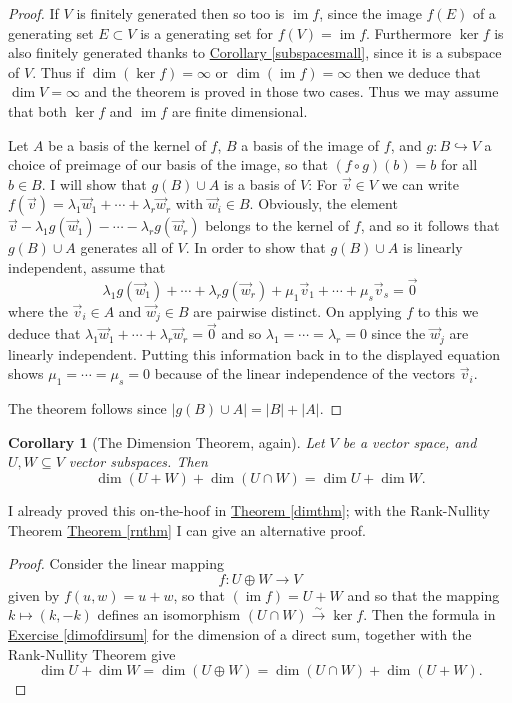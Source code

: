 \documentclass[11pt]{amsbook}
\DeclareMathOperator{\im}{\mathrm{im}}
\newtheorem{corollary}[theorem]{Corollary}
\theoremstyle{definition}
\begin{document}
\begin{proof}
If $V$ is finitely generated then so too is $\im f$, since the image $f(E)$ of a generating set $E\subset V$ is a generating set for $f(V) = \im f$. Furthermore $\ker f$ is also finitely generated thanks to \hyperref[subspacesmall]{Corollary \ref{subspacesmall}}, since it is a subspace of $V$. Thus if $\dim (\ker f) = \infty$ or $\dim (\im f) = \infty$ then we deduce that $\dim V = \infty$ and the theorem is proved in those two cases. Thus we may assume that both $\ker f$ and $\im f$ are finite dimensional.

\label{rnthm2ndpara}Let $A$ be a basis of the kernel of $f$, $B$ a basis of the image of $f$, and $g: B \hookrightarrow V$ a choice of preimage of our basis of the image, so that $(f\circ g)(b) = b$ for all $b\in B$. I will show that $g(B) \cup A$ is a basis of $V$: For $\vec{v}\in V$ we can write $f(\vec{v}) = \lambda_1 \vec{w}_1 + \cdots + \lambda_r\vec{w}_r$ with $\vec{w}_i \in B$. Obviously, the element $\vec{v}-  \lambda_1 g(\vec{w}_1) - \cdots - \lambda_rg(\vec{w}_r)$ belongs to the kernel of $f$, and so it follows that $g(B) \cup A$ generates all of $V$. In order to show that $g(B) \cup A$
is linearly independent, assume that $$ \lambda_1 g(\vec{w}_1) + \cdots + \lambda_rg(\vec{w}_r) + \mu_1 \vec{v}_1 + \cdots + \mu_s \vec{v}_s  =  \vec{0}$$ where the $\vec{v}_i\in A$ and $\vec{w}_j\in B$ are pairwise distinct. On applying $f$ to this we deduce that $\lambda_1 \vec{w}_1 + \cdots + \lambda_r \vec{w}_r =  \vec{0}$ and so $\lambda_1 = \cdots = \lambda_r = 0$ since the $\vec{w}_j$ are linearly independent. Putting this information back in to the displayed equation shows $\mu_1 = \cdots = \mu_s = 0$ because of the linear independence of the vectors $\vec{v}_i$.

The theorem follows since $|g(B) \cup A| = |B| + |A|$.

\end{proof}

\begin{corollary}[The Dimension Theorem, again] \label{dimagain} Let $V$ be a vector space, and $U,W\subseteq V$ vector subspaces. Then $$\dim (U+W) + \dim(U\cap W) = \dim U + \dim W.$$
\end{corollary}
I already proved this on-the-hoof in \hyperref[dimthm]{Theorem \ref{dimthm}}; with the Rank-Nullity Theorem \hyperref[rnthm]{Theorem \ref{rnthm}} I can give an alternative proof.
\begin{proof}Consider the linear mapping $$f: U \oplus W \to V$$ given by $f(u,w) = u+w$, so that $(\im f) = U+W$ and so that the mapping $k\mapsto (k,-k)$ defines an isomorphism $(U\cap W) \stackrel{\sim}{\to} \ker f$. Then the formula in \hyperref[dimofdirsum]{Exercise \ref{dimofdirsum}} for the dimension of a direct sum, together with the Rank-Nullity Theorem give $$\dim U + \dim W = \dim (U\oplus W) = \dim(U\cap W) + \dim (U+W).$$
\end{proof}
\end{document}
